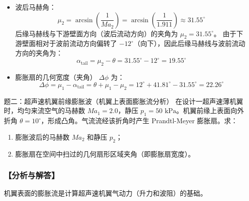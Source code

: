 \documentclass[11pt,a4paper]{ctexart}
\begin{document}
\begin{enumerate}
\begin{itemize}
        \item 波后马赫角：
        \[
        \mu_2 = \arcsin\left(\frac{1}{Ma_2}\right) = \arcsin\left(\frac{1}{1.911}\right) \approx 31.55^\circ
        \]
        后缘马赫线与下游壁面方向（波后流动方向）的夹角为 $\mu_2 = 31.55^\circ$。
        由于下游壁面相对于波前流动方向偏转了 $-12^\circ$（向下），因此后缘马赫线与波前流动方向的夹角为：
        \[
        \alpha_{\text{tail}} = \mu_2 - \theta = 31.55^\circ - 12^\circ = \mathbf{19.55^\circ}
        \]
        
        \item 膨胀扇的几何宽度（夹角） $\Delta \phi$ 为：
        \[
        \Delta \phi = \mu_1 - \alpha_{\text{tail}} = \theta + \mu_1 - \mu_2 = 12^\circ + 41.81^\circ - 31.55^\circ = \mathbf{22.26^\circ}
        \]
    \end{itemize}
\end{enumerate}

\newpage

\begin{questionbox}{题二：超声速机翼前缘膨胀波（机翼上表面膨胀流分析）}
在设计一超声速薄机翼时，均匀来流空气的马赫数 $Ma_1 = 2.0$，静压 $p_1 = 50\text{ kPa}$。机翼前缘上表面向外折角 $\theta = 10^\circ$，形成凸角。气流流经该折角时产生 Prandtl-Meyer 膨胀扇。求：
\begin{enumerate}
    \item 膨胀波后的马赫数 $Ma_2$ 和静压 $p_2$；
    \item 膨胀扇在空间中扫过的几何扇形区域夹角（即膨胀扇宽度）。
\end{enumerate}
\end{questionbox}

\subsubsection*{【分析与解答】}
机翼表面的膨胀流是计算超声速机翼气动力（升力和波阻）的基础。
\end{document}
